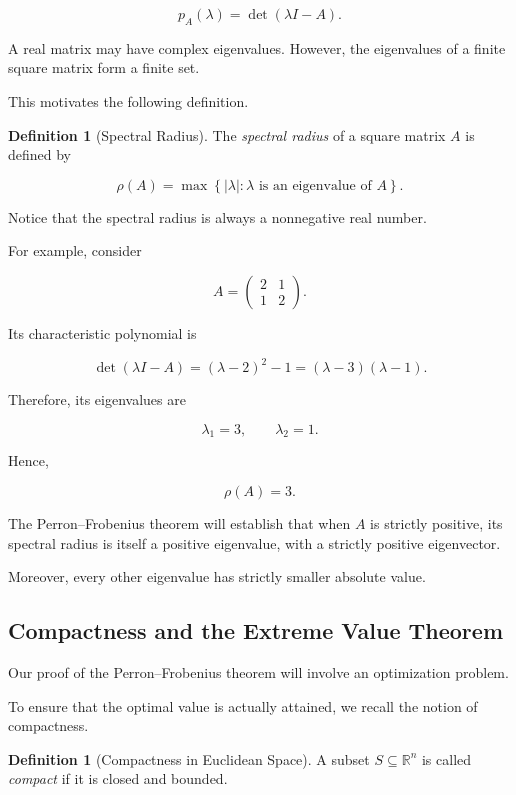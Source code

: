 \documentclass[11pt,a4paper]{article}
\theoremstyle{definition}
\newtheorem{definition}[theorem]{Definition}
\theoremstyle{remark}
\begin{document}
\[
p_A(\lambda)=\det(\lambda I-A).
\]

A real matrix may have complex eigenvalues.
However, the eigenvalues of a finite
square matrix form a finite set.

This motivates the following definition.

\begin{definition}[Spectral Radius]

The \emph{spectral radius} of a square
matrix $A$ is defined by

\begin{equation}
\rho(A)
=
\max\left\{
|\lambda|:
\lambda\text{ is an eigenvalue of }A
\right\}.
\label{eq:spectral_radius}
\end{equation}

\end{definition}

Notice that the spectral radius is
always a nonnegative real number.

For example, consider

\[
A=
\begin{pmatrix}
2&1\\
1&2
\end{pmatrix}.
\]

Its characteristic polynomial is

\[
\det(\lambda I-A)
=
(\lambda-2)^2-1
=
(\lambda-3)(\lambda-1).
\]

Therefore, its eigenvalues are

\[
\lambda_1=3,
\qquad
\lambda_2=1.
\]

Hence,

\[
\boxed{\rho(A)=3.}
\]

The Perron--Frobenius theorem will
establish that when $A$ is strictly
positive, its spectral radius
is itself a positive eigenvalue,
with a strictly positive eigenvector.

Moreover, every other eigenvalue
has strictly smaller absolute value.


\subsection{Compactness and the Extreme Value Theorem}

Our proof of the Perron--Frobenius theorem
will involve an optimization problem.

To ensure that the optimal value is
actually attained, we recall the
notion of compactness.

\begin{definition}[Compactness in Euclidean Space]

A subset $S\subseteq\mathbb{R}^n$
is called \emph{compact} if it is
closed and bounded.

\end{definition}
\end{document}
